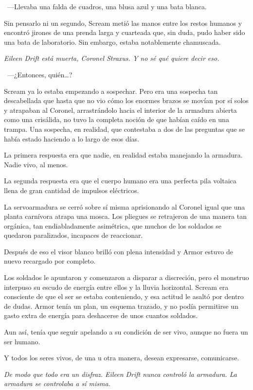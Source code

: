 ~---Llevaba una falda de cuadros, una blusa azul y una bata blanca.

Sin pensarlo ni un segundo, Scream metió las manos entre los restos humanos y encontró jirones de una prenda larga y cuarteada que, sin duda, pudo haber sido una bata de laboratorio. Sin embargo, estaba notablemente chamuscada.

\emph{Eileen Drift está muerta, Coronel Straxus. Y no sé qué quiere decir eso.}

~---¿Entonces, quién\dots?

Scream ya lo estaba empezando a sospechar. Pero era una sospecha tan descabellada que hasta que no vio cómo los enormes brazos se movían por sí solos y atrapaban al Coronel, arrastrándolo hacia el interior de la armadura abierta como una crisálida, no tuvo la completa noción de que habían caído en una trampa. Una sospecha, en realidad, que contestaba a dos de las preguntas que se había estado haciendo a lo largo de esos días.

La primera respuesta era que nadie, en realidad estaba manejando la armadura. Nadie vivo, al menos.

La segunda respuesta era que el cuerpo humano era una perfecta pila voltaica llena de gran cantidad de impulsos eléctricos.

La servoarmadura se cerró sobre sí misma aprisionando al Coronel igual que una planta carnívora atrapa una mosca. Los pliegues se retrajeron de una manera tan orgánica, tan endiabladamente asimétrica, que muchos de los soldados se quedaron paralizados, incapaces de reaccionar.

Después de eso el visor blanco brilló con plena intensidad y Armor estuvo de nuevo recargado por completo.

Los soldados le apuntaron y comenzaron a disparar a discreción, pero el monstruo interpuso su escudo de energía entre ellos y la lluvia horizontal. Scream era consciente de que el ser se estaba conteniendo, y esa actitud le asaltó por dentro de dudas. Armor tenía un plan, un esquema trazado, y no podía permitirse un gasto extra de energía para deshacerse de unos cuantos soldados.

Aun así, tenía que seguir apelando a su condición de ser vivo, aunque no fuera un ser humano.

Y todos los seres vivos, de una u otra manera, desean expresarse, comunicarse.

\emph{De modo que todo era un disfraz. Eileen Drift nunca controló la armadura. La armadura se controlaba a sí misma.}

